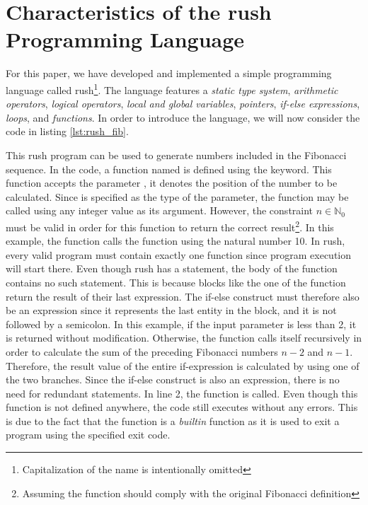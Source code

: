 \newpage %
\section{Characteristics of the rush Programming Language}

For this paper, we have developed and implemented a simple programming language called rush\footnote{Capitalization of the name is intentionally omitted}.
The language features a \emph{static type system}, \emph{arithmetic operators}, \emph{logical operators}, \emph{local and global variables}, \emph{pointers}, \emph{if-else expressions}, \emph{loops}, and \emph{functions}.
In order to introduce the language, we will now consider the code in listing \ref{lst:rush_fib}.


This rush program can be used to generate numbers included in the Fibonacci sequence.
In the code, a function named  is defined using the  keyword.
This function accepts the parameter , it denotes the position of the number to be calculated.
Since  is specified as the type of the parameter, the function may be called using any integer value as its argument.
However, the constraint $n \in \mathbb{N}_0$ must be valid in order for this function to return the correct result\footnote{Assuming the function should comply with the original Fibonacci definition}.
In this example, the  function calls the  function using the natural number 10.
In rush, every valid program must contain exactly one  function since program execution will start there.
Even though rush has a  statement, the body of the  function contains no such statement.
This is because blocks like the one of the function  return the result of their last expression.
The if-else construct must therefore also be an expression since it represents the last entity in the block, and it is not followed by a semicolon.
In this example, if the input parameter  is less than 2, it is returned without modification.
Otherwise, the function calls itself recursively in order to calculate the sum of the preceding Fibonacci numbers $n - 2$ and $n - 1$.
Therefore, the result value of the entire if-expression is calculated by using one of the two branches.
Since the if-else construct is also an expression, there is no need for redundant  statements.
In line 2, the  function is called.
Even though this function is not defined anywhere, the code still executes without any errors.
This is due to the fact that the  function is a \emph{builtin} function as it is used to exit a program using the specified exit code.


